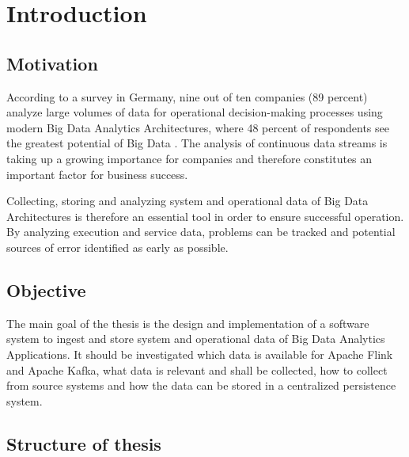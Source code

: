 \chapter{Introduction}
\section{Motivation}
According to a survey in Germany, nine out of ten companies (89 percent) analyze large volumes of data for operational decision-making
processes using modern Big Data Analytics Architectures, where 48 percent of respondents see the greatest potential of Big Data
\cite{Bitkom14}. The analysis of continuous data streams is taking up a growing importance for companies and therefore constitutes an
important factor for business success.

Collecting, storing and analyzing system and operational data of Big Data Architectures is therefore an essential tool in order
to ensure successful operation. By analyzing execution and service data, problems can be tracked and potential sources of error
identified as early as possible.

\section{Objective}

The main goal of the thesis is the design and implementation of a software system to ingest and  store system and operational
data of Big Data Analytics Applications. It should be investigated which data is available for Apache Flink and Apache Kafka, what
data is relevant and shall be collected, how to collect from source systems and how the data can be stored in a centralized persistence
system.

\section{Structure of thesis}

